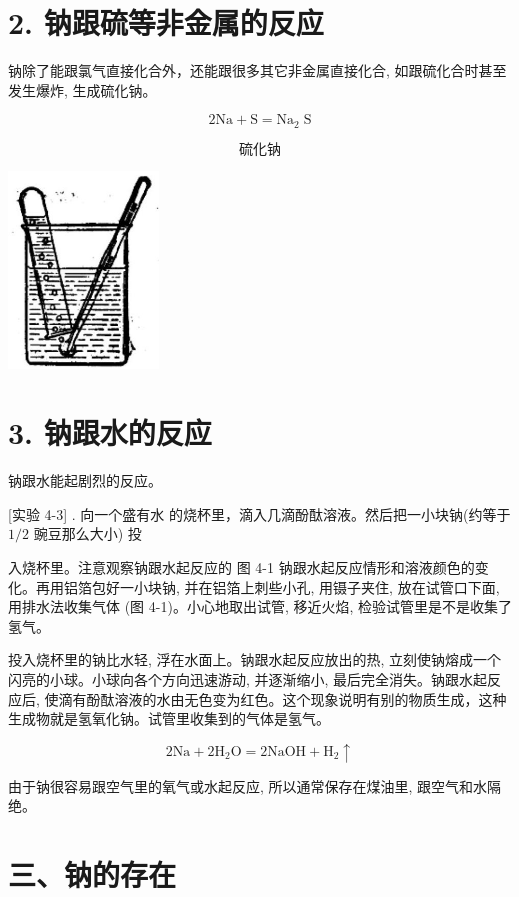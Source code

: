 \documentclass[10pt]{article}
\begin{document}
\section*{2. 钠跟硫等非金属的反应}

钠除了能跟氯气直接化合外，还能跟很多其它非金属直接化合, 如跟硫化合时甚至发生爆炸, 生成硫化钠。

\[
2\mathrm{{Na}} + \mathrm{S} = {\mathrm{{Na}}}_{2}\mathrm{\;S}
\]

\[
\text{硫化钠}
\]

\begin{center}
\includegraphics[max width=0.3\textwidth]{images/01912d0f-097c-7e75-8f32-4f326cd86c9f_89_628363.jpg}
\end{center}

\section*{3. 钠跟水的反应}

钠跟水能起剧烈的反应。

[实验 4-3] . 向一个盛有水 的烧杯里，滴入几滴酚酞溶液。然后把一小块钠(约等于 \(1/2\) 豌豆那么大小) 投

入烧杯里。注意观察钠跟水起反应的 图 4-1 钠跟水起反应情形和溶液颜色的变化。再用铝箔包好一小块钠, 并在铝箔上刺些小孔, 用镊子夹住, 放在试管口下面, 用排水法收集气体 (图 4-1)。小心地取出试管, 移近火焰, 检验试管里是不是收集了氢气。

投入烧杯里的钠比水轻, 浮在水面上。钠跟水起反应放出的热, 立刻使钠熔成一个闪亮的小球。小球向各个方向迅速游动, 并逐渐缩小, 最后完全消失。钠跟水起反应后, 使滴有酚酞溶液的水由无色变为红色。这个现象说明有别的物质生成，这种生成物就是氢氧化钠。试管里收集到的气体是氢气。

\[
2\mathrm{{Na}} + 2{\mathrm{H}}_{2}\mathrm{O} = 2\mathrm{{NaOH}} + {\mathrm{H}}_{2} \uparrow
\]

由于钠很容易跟空气里的氧气或水起反应, 所以通常保存在煤油里, 跟空气和水隔绝。

\section*{三、钠的存在}
\end{document}
